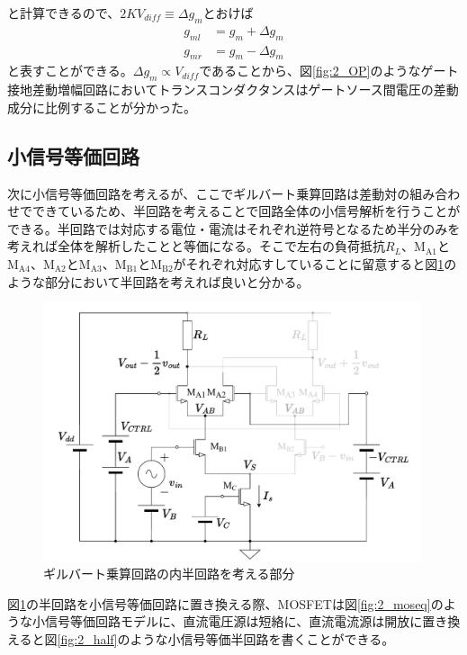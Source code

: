             と計算できるので、$2KV_{diff}\equiv\Delta g_{m}$とおけば
            \begin{align}
                g_{ml}&=g_{m}+\Delta g_{m}   \label{eq:2_dgml}\\
                g_{mr}&=g_{m}-\Delta g_{m}   \label{eq:2_dgmr}
            \end{align}
            と表すことができる。$\Delta g_{m} \propto V_{diff}$であることから、図\ref{fig:2_OP}のようなゲート接地差動増幅回路においてトランスコンダクタンスはゲートソース間電圧の差動成分に比例することが分かった。
            \newpage
            
        \subsection{小信号等価回路}
            次に小信号等価回路を考えるが、ここでギルバート乗算回路は差動対の組み合わせでできているため、半回路を考えることで回路全体の小信号解析を行うことができる。半回路では対応する電位・電流はそれぞれ逆符号となるため半分のみを考えれば全体を解析したことと等価になる。そこで左右の負荷抵抗$R_{L}$、$\mathrm{M_{A1}}$と$\mathrm{M_{A4}}$、$\mathrm{M_{A2}}$と$\mathrm{M_{A3}}$、$\mathrm{M_{B1}}$と$\mathrm{M_{B2}}$がそれぞれ対応すしていることに留意すると図\ref{fig:2_gilbert_half}のような部分において半回路を考えれば良いと分かる。
            \begin{figure}[!b]
                \centering
                \includegraphics[width=0.99\textwidth]{figures/chapter2/gilbert_half.pdf}
                \caption{ギルバート乗算回路の内半回路を考える部分}
                \label{fig:2_gilbert_half}
            \end{figure}
            図\ref{fig:2_gilbert_half}の半回路を小信号等価回路に置き換える際、MOSFETは図\ref{fig:2_moseq}のような小信号等価回路モデルに、直流電圧源は短絡に、直流電流源は開放に置き換えると図\ref{fig:2_half}のような小信号等価半回路を書くことができる。
